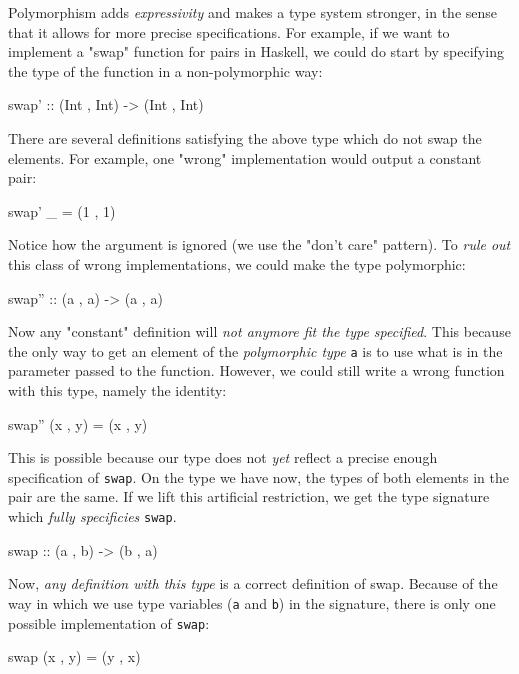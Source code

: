             Polymorphism adds \emph{expressivity} and makes a type system stronger,
            in the sense that it allows for more precise specifications.
            For example, if we want to implement a "swap" function for pairs in Haskell,
            we could do start by specifying the type of the function in a non-polymorphic way:
            \begin{haskellcode}
        swap' :: (Int , Int) -> (Int , Int)
            \end{haskellcode}

            There are several definitions satisfying the above type which do not swap the elements.
            For example, one "wrong" implementation would output a constant pair:
            \begin{haskellcode}
        swap' _ = (1 , 1)
            \end{haskellcode}

            Notice how the argument is ignored (we use the "don't care" pattern).
            To \emph{rule out} this class of wrong implementations, we could make the type polymorphic:
            \begin{haskellcode}
        swap'' :: (a , a) -> (a , a)
            \end{haskellcode}

            Now any "constant" definition will \emph{not anymore fit the type specified}.
            This because the only way to get an element of the \emph{polymorphic type} \texttt{a}
            is to use what is in the parameter passed to the function.
            However, we could still write a wrong function with this type, namely the identity:
            \begin{haskellcode}
        swap'' (x , y) = (x , y)
            \end{haskellcode}

            This is possible because our type does not \emph{yet} reflect a precise enough specification of \texttt{swap}.
            On the type we have now, the types of both elements in the pair are the same.
            If we lift this artificial restriction, we get the type signature which \emph{fully specificies} \texttt{swap}.
            \begin{haskellcode}
        swap :: (a , b) -> (b , a)
            \end{haskellcode}

            Now, \emph{any definition with this type} is a correct definition of swap.
            Because of the way in which we use type variables (\texttt{a} and \texttt{b}) in the signature,
            there is only one possible implementation of \texttt{swap}:
            \begin{haskellcode}
        swap (x , y) = (y , x)
            \end{haskellcode}

